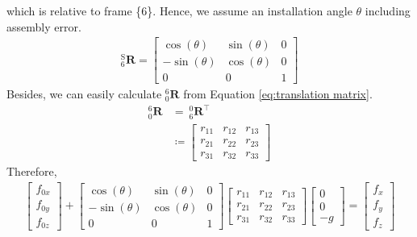 which is relative to frame \{6\}.
Hence, we assume an installation angle $\theta$ including assembly error.
\begin{equation}
\begin{split}
 ^\mathrm{S}_6\mathbf{R}
=
\begin{bmatrix}
\cos(\theta)	&\sin(\theta)	&0 \\
-\sin(\theta)	&\cos(\theta)	&0 \\
0				&0				&1
\end{bmatrix}
\end{split}
\end{equation}
Besides, we can easily calculate $^6_0\mathbf{R}$ from Equation \ref{eq:translation matrix}.
\begin{equation}
\begin{split}
^6_0\mathbf{R} 	&=\ ^0_6\mathbf{R}^\top\\
				&\coloneqq
\begin{bmatrix}
r_{11}		&r_{12}		&r_{13} \\
r_{21}		&r_{22}		&r_{23} \\
r_{31}		&r_{32}		&r_{33}
\end{bmatrix}
\end{split}
\end{equation}
Therefore,
\begin{equation}
\begin{split}
\begin{bmatrix}
f_{0x}\\
f_{0y}\\
f_{0z}
\end{bmatrix}
+
\begin{bmatrix}
\cos(\theta)	&\sin(\theta)	&0 \\
-\sin(\theta)	&\cos(\theta)	&0 \\
0				&0				&1
\end{bmatrix}
\begin{bmatrix}
r_{11}		&r_{12}		&r_{13} \\
r_{21}		&r_{22}		&r_{23} \\
r_{31}		&r_{32}		&r_{33}
\end{bmatrix}
\begin{bmatrix}
0\\
0\\
-g
\end{bmatrix}
=
\begin{bmatrix}
f_x\\
f_y\\
f_z
\end{bmatrix}
\end{split}
\end{equation}

